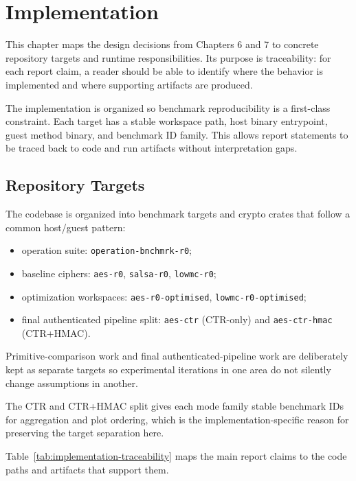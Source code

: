 \chapter{Implementation}

This chapter maps the design decisions from Chapters 6 and 7 to concrete
repository targets and runtime responsibilities. Its purpose is traceability:
for each report claim, a reader should be able to identify where the behavior is
implemented and where supporting artifacts are produced.

The implementation is organized so benchmark reproducibility is a first-class
constraint. Each target has a stable workspace path, host binary entrypoint,
guest method binary, and benchmark ID family. This allows report statements to
be traced back to code and run artifacts without interpretation gaps.

\section{Repository Targets}

The codebase is organized into benchmark targets and crypto crates that follow a
common host/guest pattern:

\begin{itemize}
\item operation suite: \texttt{operation-bnchmrk-r0};
\item baseline ciphers: \texttt{aes-r0}, \texttt{salsa-r0}, \texttt{lowmc-r0};
\item optimization workspaces: \texttt{aes-r0-optimised},
\texttt{lowmc-r0-optimised};
\item final authenticated pipeline split:
\texttt{aes-ctr} (CTR-only) and \texttt{aes-ctr-hmac} (CTR+HMAC).
\end{itemize}

Primitive-comparison work and final authenticated-pipeline work are deliberately
kept as separate targets so experimental iterations in one area do not silently
change assumptions in another.

The CTR and CTR+HMAC split gives each mode family stable benchmark IDs for
aggregation and plot ordering, which is the implementation-specific reason for
preserving the target separation here.

Table~\ref{tab:implementation-traceability} maps the main report claims to the
code paths and artifacts that support them.

